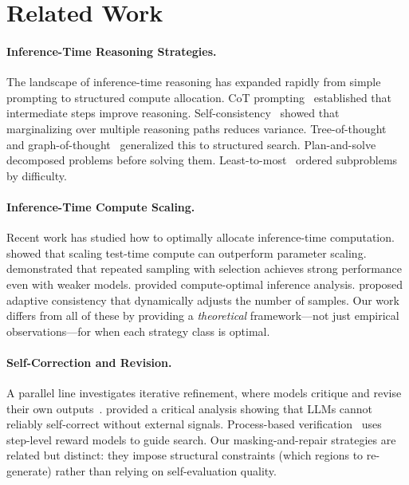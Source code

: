 \documentclass{article}
\begin{document}
\section{Related Work}
\label{sec:related}

\paragraph{Inference-Time Reasoning Strategies.}
The landscape of inference-time reasoning has expanded rapidly from simple prompting to structured compute allocation. CoT prompting~\citep{wei2022chain, kojima2022large} established that intermediate steps improve reasoning. Self-consistency~\citep{wang2022selfconsistency} showed that marginalizing over multiple reasoning paths reduces variance. Tree-of-thought~\citep{yao2023tree} and graph-of-thought~\citep{besta2024graph} generalized this to structured search. Plan-and-solve~\citep{wang2023planandsolve} decomposed problems before solving them. Least-to-most~\citep{zhou2022leasttomost} ordered subproblems by difficulty.

\paragraph{Inference-Time Compute Scaling.}
Recent work has studied how to optimally allocate inference-time computation. \citet{snell2024scaling} showed that scaling test-time compute can outperform parameter scaling. \citet{brown2024large} demonstrated that repeated sampling with selection achieves strong performance even with weaker models. \citet{wu2024empirical} provided compute-optimal inference analysis. \citet{aggarwal2023lets} proposed adaptive consistency that dynamically adjusts the number of samples. Our work differs from all of these by providing a \emph{theoretical} framework---not just empirical observations---for when each strategy class is optimal.

\paragraph{Self-Correction and Revision.}
A parallel line investigates iterative refinement, where models critique and revise their own outputs~\citep{madaan2023selfrefine, pan2023automatically}. \citet{huang2024large} provided a critical analysis showing that LLMs cannot reliably self-correct without external signals. Process-based verification~\citep{lightman2023lets, uesato2022solving} uses step-level reward models to guide search. Our masking-and-repair strategies are related but distinct: they impose structural constraints (which regions to re-generate) rather than relying on self-evaluation quality.
\end{document}
